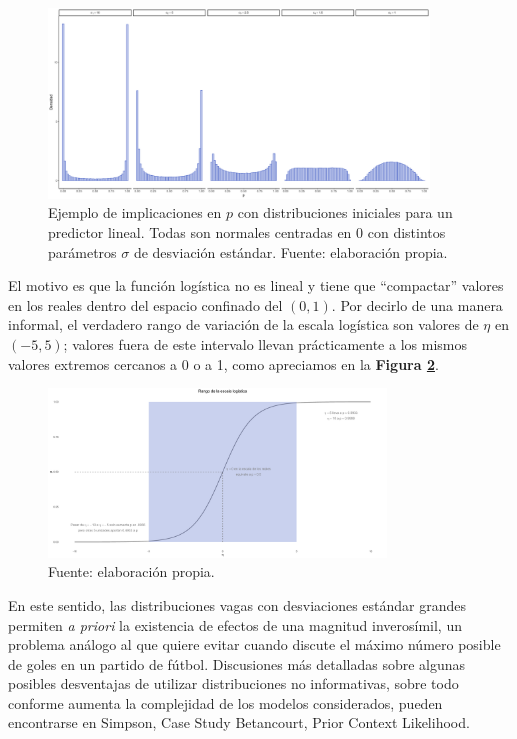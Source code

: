 \begin{figure}[h]
	\centering
	\includegraphics[width = 0.9\textwidth]{Figs/Modelado/Malas_Iniciales}
	\caption{Ejemplo de implicaciones en $p$ con distribuciones iniciales para un predictor lineal. Todas son normales centradas en $0$ con distintos parámetros $\sigma$ de desviación estándar. Fuente: elaboración propia.}
	\label{fig:Malas_Iniciales}
\end{figure}

El motivo es que la función logística no es lineal y tiene que ``compactar'' valores en los reales dentro del espacio confinado del $\left(0,1\right)$. Por decirlo de una manera informal, el verdadero rango de variación de la escala logística son valores de $\eta$ en $(-5,5)$; valores fuera de este intervalo llevan prácticamente a los mismos valores extremos cercanos a 0 o a 1, como apreciamos en la \textbf{Figura \ref{fig:Escala_Logis}}.\\

\begin{figure}[h]
	\centering
	\includegraphics[width = 0.8\textwidth]{Figs/Modelado/Escala_Logis}
	\caption{Fuente: elaboración propia.}
	\label{fig:Escala_Logis}
\end{figure}

En este sentido, las distribuciones vagas con desviaciones estándar grandes permiten \textit{a priori} la existencia de efectos de una magnitud inverosímil, un problema análogo al que \textcite{Regueiro12} quiere evitar cuando discute el máximo número posible de goles en un partido de fútbol. Discusiones más detalladas sobre algunas posibles desventajas de utilizar distribuciones no informativas, sobre todo conforme aumenta la complejidad de los modelos considerados, pueden encontrarse en {\color{Red} Simpson, Case Study Betancourt, Prior Context Likelihood}.\\

